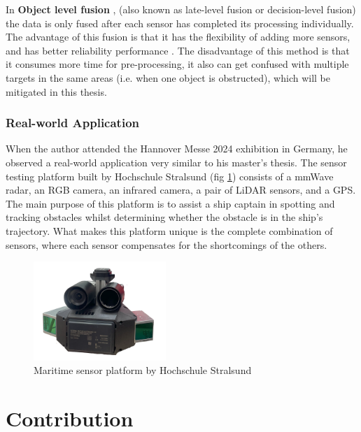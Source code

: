 In \textbf{Object level fusion} \cite{8711717}, (also known as late-level fusion or decision-level fusion) the data is only fused after each sensor has completed its processing individually.
The advantage of this fusion is that it has the flexibility of adding more sensors,
and has better reliability performance \cite{su14095114}.
The disadvantage of this method is that it consumes more time for pre-processing, it also can get confused with multiple targets in the same areas (i.e. when one object is obstructed),
which will be mitigated in this thesis.


\subsubsection{Real-world Application}
When the author attended the Hannover Messe 2024 exhibition in Germany, 
he observed a real-world application very similar to his master's thesis. 
The sensor testing platform built by Hochschule Stralsund (fig \ref{fig:host_maritime_sensors}) consists of a mmWave radar, 
an RGB camera, an infrared camera, a pair of LiDAR sensors, and a GPS. 
The main purpose of this platform is to assist a ship captain in spotting and 
tracking obstacles whilst determining whether the obstacle is in the ship's trajectory. 
What makes this platform unique is the complete combination of sensors, 
where each sensor compensates for the shortcomings of the others.

\begin{figure}[hpbt]
    \centering
    \includegraphics[width=5cm]{Figures/host_maritime_sensors.png}%
    \caption{Maritime sensor platform by Hochschule Stralsund}
    \label{fig:host_maritime_sensors}
\end{figure}

\newpage

\section{Contribution}\label{sec:1-contribution}


